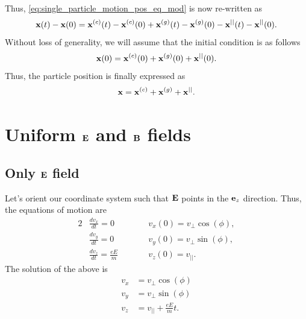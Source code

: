 \documentclass[a4paper,11pt]{report}
\begin{document}
Thus, \cref{eq:single_particle_motion_pos_eq_mod} is now re-written as
\begin{equation}
    \mathbf{x}(t) - \mathbf{x}(0) = \mathbf{x}^{(c)}(t) - \mathbf{x}^{(c)}(0) + \mathbf{x}^{(g)}(t) - \mathbf{x}^{(g)}(0) - \mathbf{x}^{||}(t) - \mathbf{x}^{||}(0).
\end{equation}
Without loss of generality, we will assume that the initial condition is as follows
\begin{equation}
    \mathbf{x}(0) = \mathbf{x}^{(c)}(0) + \mathbf{x}^{(g)}(0) + \mathbf{x}^{||}(0).
\end{equation}
Thus, the particle position is finally expressed as
\begin{equation}
    \label{eq:single_particle_motion_pos_general}
    \mathbf{x} = \mathbf{x}^{(c)} + \mathbf{x}^{(g)} + \mathbf{x}^{||}.
\end{equation}

\section{Uniform $\mathbf{E}$ and $\mathbf{B}$ fields}

\subsection{Only $\mathbf{E}$ field}
Let's orient our coordinate system such that $\mathbf{E}$ points in the $\mathbf{e}_z$ direction. Thus, the equations of motion are
\begin{alignat}{2}
    &\frac{d v_x}{dt} = 0  \qquad && v_x(0) = v_\perp \cos(\phi), \nonumber \\
    &\frac{d v_y}{dt} = 0  \qquad && v_y(0) = v_\perp \sin(\phi), \nonumber \\
    &\frac{d v_z}{dt} = \frac{e E}{m}  \qquad && v_z(0) = v_{||}.
\end{alignat}
The solution of the above is
\begin{align}
    v_x &= v_\perp \cos(\phi) \nonumber \\
    v_y &= v_\perp \sin(\phi) \nonumber \\
    v_z &= v_{||} + \frac{e E}{m} t.
\end{align}

\end{document}
